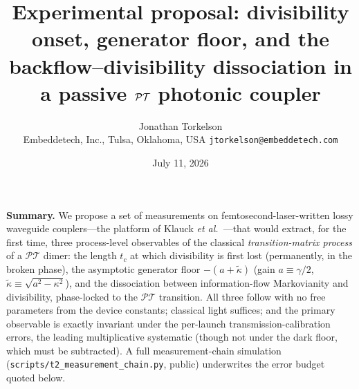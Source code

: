 \documentclass[11pt]{article}
\title{\vspace{-1.2em}Experimental proposal: divisibility onset, generator
floor, and the backflow--divisibility dissociation in a passive $\PT$
photonic coupler\vspace{-0.4em}}
\author{Jonathan Torkelson\\[2pt]
\small Embeddetech, Inc., Tulsa, Oklahoma, USA \quad
\texttt{jtorkelson@embeddetech.com}}
\date{July 11, 2026}
\newcommand{\PT}{\mathcal{PT}}
\begin{document}
\maketitle
\vspace{-1.5em}

\noindent\textbf{Summary.} We propose a set of measurements on
femtosecond-laser-written lossy waveguide couplers---the platform of
Klauck \emph{et al.}~\cite{Klauck2019}---that would extract, for the
first time, three process-level observables of the classical
\emph{transition-matrix process} of a $\PT$ dimer: the length $t_c$ at
which divisibility is first lost (permanently, in the broken phase), the asymptotic generator floor
$-(a+\tilde\kappa)$ (gain $a\equiv\gamma/2$, $\tilde\kappa\equiv\sqrt{a^2-\kappa^2}$), and the dissociation between
information-flow Markovianity and divisibility, phase-locked to the
$\PT$ transition. All three follow with
no free parameters from the device constants; classical light
suffices; and the primary observable is exactly invariant under the
per-launch transmission-calibration errors, the leading multiplicative
systematic (though not under the dark floor, which must be
subtracted). A full measurement-chain simulation
(\texttt{scripts/t2\_measurement\_chain.py}, public) underwrites the error
budget quoted below.
\end{document}
